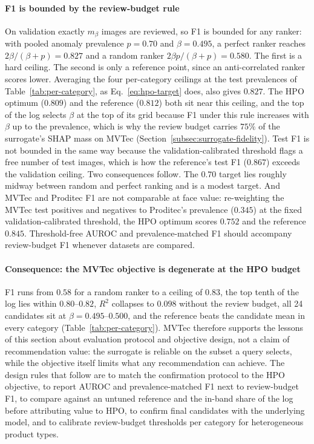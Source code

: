 \documentclass[final,5p,times,twocolumn]{elsarticle}
\begin{document}
\paragraph{F1 is bounded by the review-budget rule}
On validation exactly $m_{\beta}$ images are reviewed, so F1 is bounded
for any ranker: with pooled anomaly prevalence $p = 0.70$ and
$\beta = 0.495$, a perfect ranker reaches $2\beta/(\beta+p) = 0.827$
and a random ranker $2\beta p/(\beta+p) = 0.580$. The first is a hard ceiling. The second is only a reference point, since an anti-correlated ranker scores lower. Averaging the four per-category ceilings at the test prevalences of Table~\ref{tab:per-category}, as Eq.~\ref{eq:hpo-target} does, also gives $0.827$. The HPO optimum
($0.809$) and the reference ($0.812$) both sit near this ceiling, and
the top of the log selects $\beta$ at the top of its grid because F1
under this rule increases with $\beta$ up to the prevalence, which is
why the review budget carries $75\%$ of the surrogate's SHAP mass on
MVTec (Section~\ref{subsec:surrogate-fidelity}). Test F1 is not bounded
in the same way because the validation-calibrated threshold flags a
free number of test images, which is how the reference's test F1
($0.867$) exceeds the validation ceiling. Two consequences follow. The
$0.70$ target lies roughly midway between random and perfect ranking
and is a modest target. And MVTec and Proditec F1 are not comparable at face value: re-weighting the MVTec test positives and negatives to Proditec's prevalence ($0.345$) at the fixed validation-calibrated threshold, the HPO optimum scores $0.752$ and the reference $0.845$. Threshold-free AUROC and
prevalence-matched F1 should accompany review-budget F1 whenever
datasets are compared.

\paragraph{Consequence: the MVTec objective is degenerate at the HPO budget}
F1 runs from $0.58$ for a random ranker to a ceiling of $0.83$, the top tenth of the log lies within
$0.80$--$0.82$, $R^2$ collapses to $0.098$ without the review budget,
all 24 candidates sit at $\beta = 0.495$--$0.500$, and the reference
beats the candidate mean in every category
(Table~\ref{tab:per-category}). MVTec therefore supports the lessons of this section about evaluation protocol and objective design, not a claim of recommendation value: the surrogate is reliable on the subset a query selects, while
the objective itself limits what any recommendation can achieve. The
design rules that follow are to match the confirmation protocol to the
HPO objective, to report AUROC and prevalence-matched F1 next to
review-budget F1, to compare against an untuned reference and the
in-band share of the log before attributing value to HPO, to confirm
final candidates with the underlying model, and to calibrate
review-budget thresholds per category for heterogeneous product types.
\end{document}

